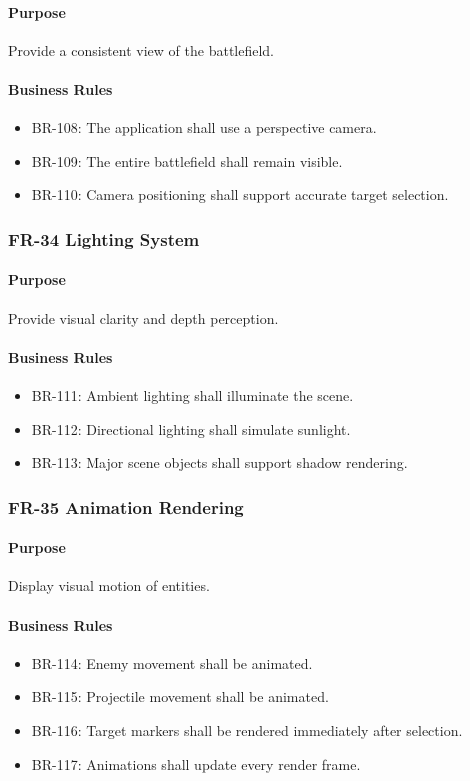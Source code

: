 \documentclass[11pt,a4paper]{article}
\begin{document}
\paragraph{Purpose}
Provide a consistent view of the battlefield.

\paragraph{Business Rules}
\begin{itemize}
  \item BR-108: The application shall use a perspective camera.
  \item BR-109: The entire battlefield shall remain visible.
  \item BR-110: Camera positioning shall support accurate target selection.
\end{itemize}

\subsubsection{FR-34 Lighting System}

\paragraph{Purpose}
Provide visual clarity and depth perception.

\paragraph{Business Rules}
\begin{itemize}
  \item BR-111: Ambient lighting shall illuminate the scene.
  \item BR-112: Directional lighting shall simulate sunlight.
  \item BR-113: Major scene objects shall support shadow rendering.
\end{itemize}

\subsubsection{FR-35 Animation Rendering}

\paragraph{Purpose}
Display visual motion of entities.

\paragraph{Business Rules}
\begin{itemize}
  \item BR-114: Enemy movement shall be animated.
  \item BR-115: Projectile movement shall be animated.
  \item BR-116: Target markers shall be rendered immediately after selection.
  \item BR-117: Animations shall update every render frame.
\end{itemize}
\end{document}
